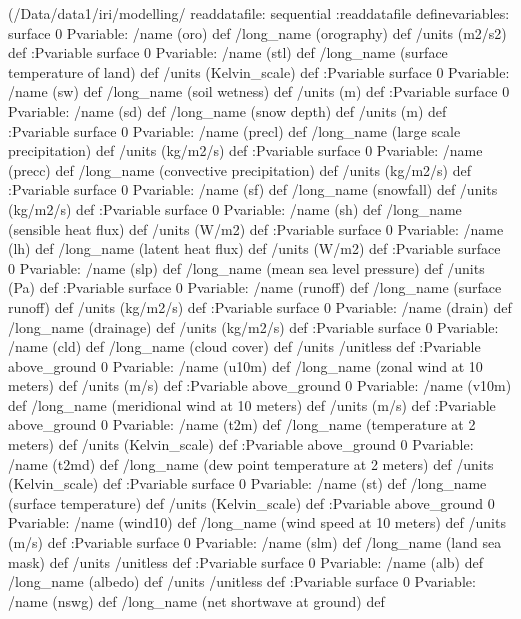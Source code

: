 \begin{ingrid}
   (/Data/data1/iri/modelling/%
readdatafile:
sequential
:readdatafile
definevariables:
surface 0 Pvariable: /name (oro) def /long_name (orography) def
/units (m2/s2) def :Pvariable
surface 0 Pvariable: /name (stl) def /long_name (surface temperature of land) def /units (Kelvin_scale) def :Pvariable
surface 0 Pvariable: /name (sw) def /long_name (soil wetness) def 
/units (m) def :Pvariable
surface 0 Pvariable: /name (sd) def /long_name (snow depth) def
/units (m) def  :Pvariable
surface 0 Pvariable: /name (precl) def /long_name (large scale precipitation) def /units (kg/m2/s) def :Pvariable
surface 0 Pvariable: /name (precc) def /long_name (convective precipitation) def  /units (kg/m2/s) def :Pvariable
surface 0 Pvariable: /name (sf) def /long_name (snowfall) def
/units (kg/m2/s) def :Pvariable
surface 0 Pvariable: /name (sh) def /long_name (sensible heat flux) def 
/units (W/m2) def :Pvariable
surface 0 Pvariable: /name (lh) def /long_name (latent heat flux) def 
/units (W/m2) def :Pvariable
surface 0 Pvariable: /name (slp) def /long_name (mean sea level pressure) def
/units (Pa) def :Pvariable
surface 0 Pvariable: /name (runoff) def /long_name (surface runoff) def
/units (kg/m2/s) def :Pvariable
surface 0 Pvariable: /name (drain) def /long_name (drainage) def 
/units (kg/m2/s) def :Pvariable
surface 0 Pvariable: /name (cld) def /long_name (cloud cover) def
/units /unitless def :Pvariable
above_ground 0 Pvariable: /name (u10m) def /long_name (zonal wind at 10 meters) def /units (m/s) def :Pvariable
above_ground 0 Pvariable: /name (v10m) def /long_name (meridional wind at 10 meters) def  /units (m/s) def :Pvariable
above_ground 0 Pvariable: /name (t2m) def /long_name (temperature at 2 meters) def /units (Kelvin_scale) def  :Pvariable
above_ground 0 Pvariable: /name (t2md) def /long_name (dew point temperature at 2 meters) def /units (Kelvin_scale) def  :Pvariable
surface 0 Pvariable: /name (st) def /long_name (surface temperature) def /units (Kelvin_scale) def  :Pvariable
above_ground 0 Pvariable: /name (wind10) def /long_name (wind speed at 10 meters) def
/units (m/s) def :Pvariable
surface 0 Pvariable: /name (slm) def /long_name (land sea mask) def /units /unitless def :Pvariable
surface 0 Pvariable: /name (alb) def /long_name (albedo) def /units /unitless def :Pvariable
surface 0 Pvariable: /name (nswg) def /long_name (net shortwave at ground) def 

\end{ingrid}
